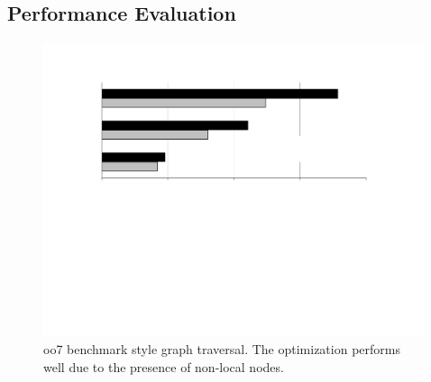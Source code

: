\documentclass[10pt,letterpaper,twocolumn,english]{article}
\newcommand{\yad}{LLADD\xspace}
\newcommand{\rcs}[1]{\textcolor{green}{\bf RCS: #1}}
\begin{document}




\subsection {Performance Evaluation}

\begin{figure}[t]
\vspace{-30pt}
\hspace{-0.4in}
\includegraphics[width=4.4in]{oo7.pdf}
\vspace{-125pt}
\caption{\sf\label{fig:oo7} oo7 benchmark style graph traversal.  The optimization performs well due to the presence of non-local nodes.}
\end{figure}
\end{document}
